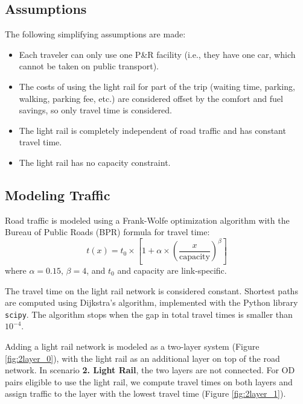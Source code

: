 \subsection{Assumptions}

The following simplifying assumptions are made:
\begin{itemize}
    \item Each traveler can only use one P\&R facility (i.e., they have one car, which cannot be taken on public transport).
    \item The costs of using the light rail for part of the trip (waiting time, parking, walking, parking fee, etc.) are considered offset by the comfort and fuel savings, so only travel time is considered.
    \item The light rail is completely independent of road traffic and has constant travel time.
    \item The light rail has no capacity constraint.
\end{itemize}

\subsection{Modeling Traffic}

Road traffic is modeled using a Frank-Wolfe optimization algorithm with the Bureau of Public Roads (BPR) formula for travel time:
\begin{equation}
    t(x) = t_0 \times \left [ 1 + \alpha \times \left (\frac{x}{\text{capacity}} \right )^\beta \right ]
\end{equation}
where $\alpha = 0.15$, $\beta = 4$, and $t_0$ and capacity are link-specific.

The travel time on the light rail network is considered constant. Shortest paths are computed using Dijkstra's algorithm, implemented with the Python library \texttt{scipy}. The algorithm stops when the gap in total travel times is smaller than $10^{-4}$.

Adding a light rail network is modeled as a two-layer system (Figure \ref{fig:2layer_0}), with the light rail as an additional layer on top of the road network. In scenario \textbf{2. Light Rail}, the two layers are not connected. For OD pairs eligible to use the light rail, we compute travel times on both layers and assign traffic to the layer with the lowest travel time (Figure \ref{fig:2layer_1}).

